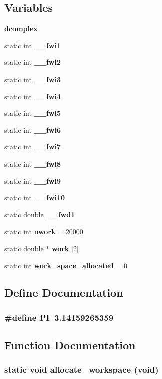 \subsection*{Variables}
\begin{CompactItemize}
\item 
{\bf dcomplex}
\item 
static int {\bf \_\-\_\-fwi1}
\item 
static int {\bf \_\-\_\-fwi2}
\item 
static int {\bf \_\-\_\-fwi3}
\item 
static int {\bf \_\-\_\-fwi4}
\item 
static int {\bf \_\-\_\-fwi5}
\item 
static int {\bf \_\-\_\-fwi6}
\item 
static int {\bf \_\-\_\-fwi7}
\item 
static int {\bf \_\-\_\-fwi8}
\item 
static int {\bf \_\-\_\-fwi9}
\item 
static int {\bf \_\-\_\-fwi10}
\item 
static double {\bf \_\-\_\-fwd1}
\item 
static int {\bf nwork} = 20000
\item 
static double $\ast$ {\bf work} [2]
\item 
static int {\bf work\_\-space\_\-allocated} = 0
\end{CompactItemize}


\subsection{Define Documentation}
\subsubsection{\setlength{\rightskip}{0pt plus 5cm}\#define PI~3.14159265359}\label{fftwrap_8c_598a3330b3c21701223ee0ca14316eca}




\subsection{Function Documentation}
\subsubsection{\setlength{\rightskip}{0pt plus 5cm}static void allocate\_\-workspace (void)\hspace{0.3cm}{\tt  [static]}}\label{fftwrap_8c_cf893a7a788dae71fa90c3b5eda18a3f}


